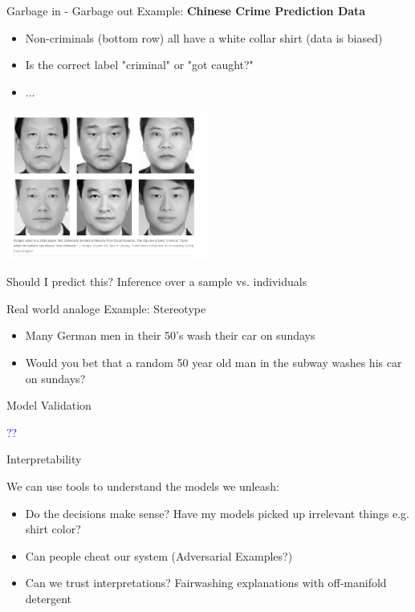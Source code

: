 \begin{vbframe}{Garbage in - Garbage out}
Example: \textbf{Chinese Crime Prediction Data}
\begin{itemize}
    \item Non-criminals (bottom row) all have a white collar shirt (data is biased)
    \item Is the correct label "criminal" or "got caught?"
    \item ...
\end{itemize}

\begin{center}
\includegraphics[width = 0.5\textwidth]{figure_man/acc-chinese-crime.png}
\end{center}

\end{vbframe}
\begin{vbframe}{ Should I predict this? Inference over a sample vs. individuals}

Real world analoge Example: Stereotype

\begin{itemize}
    \item Many German men in their 50's wash their car on sundays
    \item Would you bet that a random 50 year old man in the subway washes his car on sundays?
\end{itemize}


\end{vbframe}
\begin{vbframe}{Model Validation}

\textcolor{blue}{??}

\end{vbframe}
\begin{vbframe}{Interpretability}

We can use tools to understand the models we unleash:

\begin{itemize}
\item Do the decisions make sense? Have my models picked up irrelevant things e.g. shirt color?
\item Can people cheat our system (Adversarial Examples?)
\item Can we trust interpretations? Fairwashing explanations with off-manifold detergent 
\end{itemize}
\end{vbframe}
